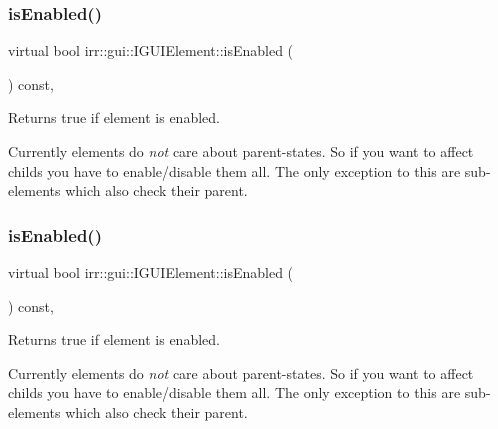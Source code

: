 \subsubsection{\texorpdfstring{is\+Enabled()}{isEnabled()}\hspace{0.1cm}{\footnotesize\ttfamily [1/2]}}
{\footnotesize\ttfamily virtual bool irr\+::gui\+::\+I\+G\+U\+I\+Element\+::is\+Enabled (\begin{DoxyParamCaption}{ }\end{DoxyParamCaption}) const\hspace{0.3cm}{\ttfamily [inline]}, {\ttfamily [virtual]}}



Returns true if element is enabled. 

Currently elements do {\itshape not} care about parent-\/states. So if you want to affect childs you have to enable/disable them all. The only exception to this are sub-\/elements which also check their parent. \mbox{\label{classirr_1_1gui_1_1IGUIElement_add00898b0ee96565f55b1b47efaceec6}} 
\subsubsection{\texorpdfstring{is\+Enabled()}{isEnabled()}\hspace{0.1cm}{\footnotesize\ttfamily [2/2]}}
{\footnotesize\ttfamily virtual bool irr\+::gui\+::\+I\+G\+U\+I\+Element\+::is\+Enabled (\begin{DoxyParamCaption}{ }\end{DoxyParamCaption}) const\hspace{0.3cm}{\ttfamily [inline]}, {\ttfamily [virtual]}}



Returns true if element is enabled. 

Currently elements do {\itshape not} care about parent-\/states. So if you want to affect childs you have to enable/disable them all. The only exception to this are sub-\/elements which also check their parent. \mbox{\label{classirr_1_1gui_1_1IGUIElement_a72fe3668d62bfb7edc4586d582a947b4}} 
